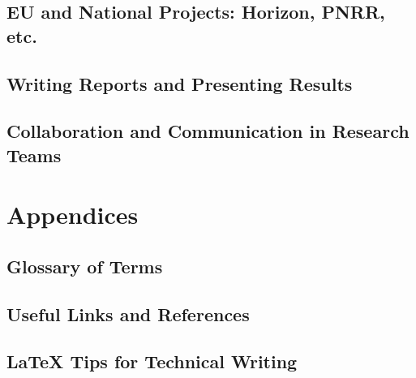 \documentclass[11pt]{article}
\begin{document}
	\subsection{EU and National Projects: Horizon, PNRR, etc.}
	\subsection{Writing Reports and Presenting Results}
	\subsection{Collaboration and Communication in Research Teams}
	
	\section{Appendices}
	\subsection{Glossary of Terms}
	\subsection{Useful Links and References}
	\subsection{LaTeX Tips for Technical Writing}
	
	
	
	
	
\end{document}

